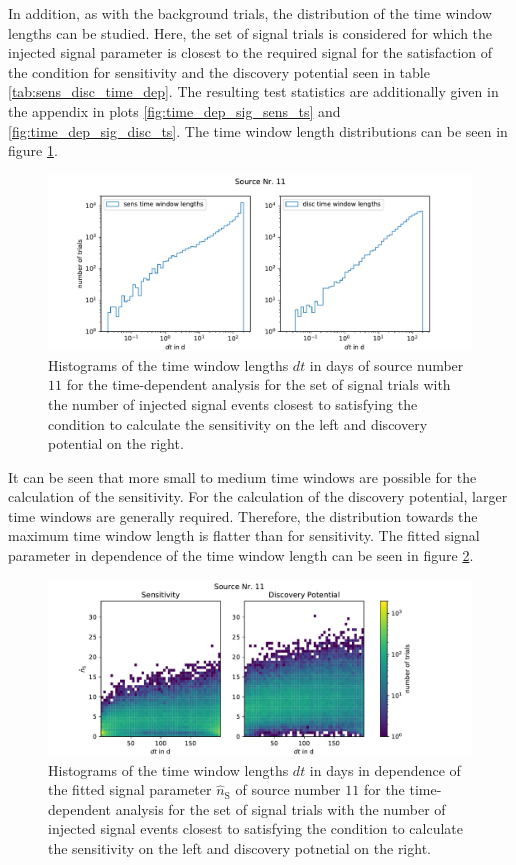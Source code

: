In addition, as with the background trials, the distribution of the time window lengths can be studied.
Here, the set of signal trials is considered for which the injected signal parameter is closest to the required signal for the satisfaction of the condition for sensitivity and the discovery potential seen in table \ref{tab:sens_disc_time_dep}.
The resulting test statistics are additionally given in the appendix in plots \ref{fig:time_dep_sig_sens_ts} and \ref{fig:time_dep_sig_disc_ts}.
The time window length distributions can be seen in figure \ref{fig:sens_disc_dt_1}.
\begin{figure}
    \centering
    \includegraphics[width=\linewidth]{Plots/05_csky/9_years_gfu_gold_disc_sens_time_dep_dt_1.pdf}
    \caption{Histograms of the time window lengths $dt$ in days of source number $\num{11}$ for the time-dependent analysis for the set of signal trials with the number of injected signal events closest to satisfying the condition to calculate the sensitivity on the left and discovery potential on the right.}
    \label{fig:sens_disc_dt_1}
\end{figure}
It can be seen that more small to medium time windows are possible for the calculation of the sensitivity.
For the calculation of the discovery potential, larger time windows are generally required.
Therefore, the distribution towards the maximum time window length is flatter than for sensitivity.
The fitted signal parameter in dependence of the time window length can be seen in figure \ref{fig:sens_disc_ns_dt_1}.
\begin{figure}
    \centering
    \includegraphics[width=\linewidth]{Plots/05_csky/time_window_ns_disc_sens_time_dep_1.pdf}
    \caption{Histograms of the time window lengths $dt$ in days in dependence of the fitted signal parameter $\hat{n}_\text{S}$ of source number $\num{11}$ for the time-dependent analysis for the set of signal trials with the number of injected signal events closest to satisfying the condition to calculate the sensitivity on the left and discovery potnetial on the right.}
    \label{fig:sens_disc_ns_dt_1}
\end{figure}
